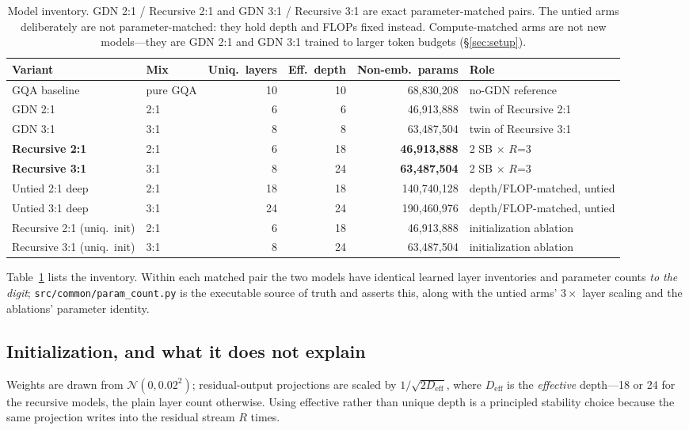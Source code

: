 \documentclass[11pt]{article}
\begin{document}
\begin{table}[t]
\centering
\small
\begin{tabular}{llrrrl}
\toprule
Variant & Mix & Uniq.\ layers & Eff.\ depth & Non-emb.\ params & Role \\
\midrule
GQA baseline & pure GQA & 10 & 10 & 68{,}830{,}208 & no-GDN reference \\
GDN 2:1 & 2:1 & 6 & 6 & 46{,}913{,}888 & twin of Recursive 2:1 \\
GDN 3:1 & 3:1 & 8 & 8 & 63{,}487{,}504 & twin of Recursive 3:1 \\
\textbf{Recursive 2:1} & 2:1 & 6 & 18 & \textbf{46{,}913{,}888} & 2 SB $\times$ $R$=3 \\
\textbf{Recursive 3:1} & 3:1 & 8 & 24 & \textbf{63{,}487{,}504} & 2 SB $\times$ $R$=3 \\
Untied 2:1 deep & 2:1 & 18 & 18 & 140{,}740{,}128 & depth/FLOP-matched, untied \\
Untied 3:1 deep & 3:1 & 24 & 24 & 190{,}460{,}976 & depth/FLOP-matched, untied \\
Recursive 2:1 (uniq.\ init) & 2:1 & 6 & 18 & 46{,}913{,}888 & initialization ablation \\
Recursive 3:1 (uniq.\ init) & 3:1 & 8 & 24 & 63{,}487{,}504 & initialization ablation \\
\bottomrule
\end{tabular}
\caption{Model inventory. GDN 2:1 / Recursive 2:1 and GDN 3:1 / Recursive 3:1 are exact parameter-matched pairs. The untied arms deliberately are not parameter-matched: they hold depth and FLOPs fixed instead. Compute-matched arms are not new models---they are GDN 2:1 and GDN 3:1 trained to larger token budgets (\S\ref{sec:setup}).}
\label{tab:variants}
\end{table}

Table~\ref{tab:variants} lists the inventory. Within each matched pair the two models have identical learned layer inventories and parameter counts \emph{to the digit}; \texttt{src/common/param\_count.py} is the executable source of truth and asserts this, along with the untied arms' $3\times$ layer scaling and the ablations' parameter identity.

\subsection{Initialization, and what it does not explain}
\label{sec:init-design}

Weights are drawn from $\mathcal{N}(0, 0.02^2)$; residual-output projections are scaled by $1/\sqrt{2 D_{\text{eff}}}$, where $D_{\text{eff}}$ is the \emph{effective} depth---18 or 24 for the recursive models, the plain layer count otherwise. Using effective rather than unique depth is a principled stability choice because the same projection writes into the residual stream $R$ times.
\end{document}

